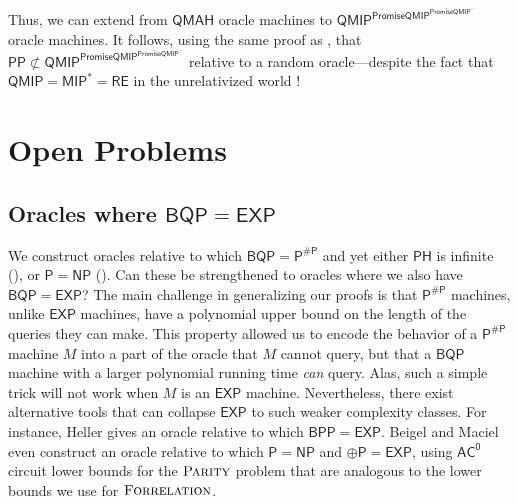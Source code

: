 \documentclass[11pt]{article}%
\newcommand{\PARITY}{\normalfont\textsc{Parity}}
\newcommand{\Forrelation}{\normalfont\textsc{Forrelation}}
\begin{document}
Thus, we can extend  from $\mathsf{QMAH}$ oracle machines to $\mathsf{QMIP}^{\mathsf{PromiseQMIP}^{\mathsf{PromiseQMIP}^{\cdots}}}$ oracle machines. It follows, using the same proof as , that $\mathsf{PP} \not\subset \mathsf{QMIP}^{\mathsf{PromiseQMIP}^{\mathsf{PromiseQMIP}^{\cdots}}}$ relative to a random oracle---despite the fact that $\mathsf{QMIP} = \mathsf{MIP}^{*}=\mathsf{RE}$ in the unrelativized world \cite{RUV13,JNVWY20}!

\section{Open Problems\label{OPEN}}

\subsection{Oracles where \texorpdfstring{$\mathsf{BQP} = \mathsf{EXP}$}{BQP = EXP}}

We construct oracles relative to which $\mathsf{BQP} = \mathsf{P}^{\mathsf{\# P}}$ and yet either $\mathsf{PH}$ is infinite (), or $\mathsf{P} = \mathsf{NP}$ (). Can these be strengthened to oracles where we also have $\mathsf{BQP} = \mathsf{EXP}$? The main challenge in generalizing our proofs is that $\mathsf{P^{\# P}}$ machines, unlike $\mathsf{EXP}$ machines, have a polynomial upper bound on the length of the queries they can make. This property allowed us to encode the behavior of a $\mathsf{P^{\# P}}$ machine $M$ into a part of the oracle that $M$ cannot query, but that a $\mathsf{BQP}$ machine with a larger polynomial running time \textit{can} query. Alas, such a simple trick will not work when $M$ is an $\mathsf{EXP}$ machine. Nevertheless, there exist alternative tools that can collapse $\mathsf{EXP}$ to such weaker complexity classes. For instance, Heller \cite{Hel86} gives an oracle relative to which $\mathsf{BPP} = \mathsf{EXP}$. Beigel and Maciel \cite{BM99} even construct an oracle relative to which $\mathsf{P} = \mathsf{NP}$ and $\mathsf{\oplus P} = \mathsf{EXP}$, using $\mathsf{AC^0}$ circuit lower bounds for the $\PARITY$ problem that are analogous to the lower bounds we use for $\Forrelation$.
\end{document}
